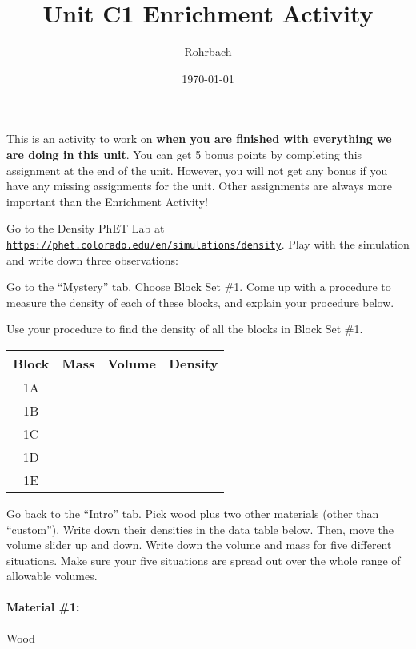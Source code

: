 \documentclass[10pt]{exam}
\title{Unit C1 Enrichment Activity}
\author{Rohrbach}
\date{\today}
\begin{document}
\maketitle

\noindent
This is an activity to work on {\bf when you are finished with everything we are doing in this unit}.  You can get 5 bonus points by completing this assignment at the end of the unit. However, you will not get any bonus if you have any missing assignments for the unit.  Other assignments are always more important than the Enrichment Activity!

\begin{questions}
  \question
    Go to the Density PhET Lab at \texttt{\href{https://phet.colorado.edu/en/simulations/density}{https://phet.colorado.edu/en/simulations/density}}.  Play with the simulation and write down three observations:
    \vs 

  \question
    Go to the ``Mystery'' tab.  Choose Block Set \#1.  Come up with a procedure to measure the density of each of these blocks, and explain your procedure below.
    \vs 

  \question
    Use your procedure to find the density of all the blocks in Block Set \#1.

    \begin{tabular}{|c|p{5em}|p{5em}||p{5em}|}
      \hline
      Block & Mass & Volume & Density \\\hline
      1A    &&&\\[1em]\hline
      1B    &&&\\[1em]\hline
      1C    &&&\\[1em]\hline
      1D    &&&\\[1em]\hline
      1E    &&&\\[1em]\hline
    \end{tabular}


  \pagebreak
  \question
    Go back to the ``Intro'' tab.  Pick wood plus two other materials (other than ``custom'').  Write down their densities in the data table below.  Then, move the volume slider up and down.  Write down the volume and mass for five different situations.  Make sure your five situations are spread out over the whole range of allowable volumes.


    \begin{multicols}{3}

      \paragraph{Material \#1:} Wood
    

\end{multicols}
\end{questions}
\end{document}
